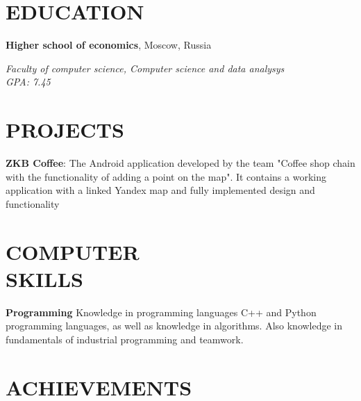 \documentclass[margin]{res}
\begin{document}
\begin{resume}

\section{EDUCATION}
\textbf{Higher school of economics}, Moscow, Russia\\
{\sl Faculty of computer science, Computer science and data analysys\\
{\hfill GPA: 
7.45}
\\

\section{PROJECTS}
\par
\textbf{ZKB Coffee}: 
The Android application developed by the team "Coffee shop chain with the functionality of adding a point on the map". It contains a working application with a linked Yandex map and fully implemented design and functionality
\\


\section{COMPUTER\\SKILLS}

\textbf{Programming} 
Knowledge in programming languages C++ and Python programming languages, as well as knowledge in algorithms. Also knowledge in fundamentals of industrial programming and teamwork. 


\section{ACHIEVEMENTS}

}
\end{resume}
\end{document}
